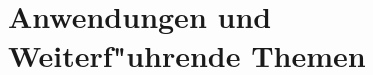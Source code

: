 \documentclass{book}
\begin{document}
\part{Anwendungen und Weiterf"uhrende Themen}

\def\chapterauthor#1{{\large #1}\bigskip\bigskip}














%


%
%
%
%
%
\vfill
\pagebreak
\ifodd\value{page}\else\null\clearpage\fi
{}
\rhead{}

\end{document}
